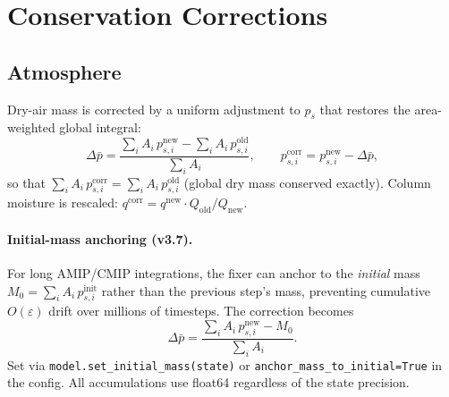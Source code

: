 \documentclass[11pt,a4paper]{article}
\begin{document}
\section{Conservation Corrections}

\subsection{Atmosphere}
Dry-air mass is corrected by a uniform adjustment to $p_s$ that restores the area-weighted global integral:
\begin{equation}
  \Delta\bar p = \frac{\sum_i A_i\,p_{s,i}^{\mathrm{new}} - \sum_i A_i\,p_{s,i}^{\mathrm{old}}}{\sum_i A_i},
  \qquad
  p_{s,i}^{\mathrm{corr}} = p_{s,i}^{\mathrm{new}} - \Delta\bar p,
\end{equation}
so that $\sum_i A_i\,p_{s,i}^{\mathrm{corr}}=\sum_i A_i\,p_{s,i}^{\mathrm{old}}$ (global dry mass conserved exactly).
Column moisture is rescaled: $q^{\mathrm{corr}}=q^{\mathrm{new}}\cdot Q_{\mathrm{old}}/Q_{\mathrm{new}}$.

\paragraph{Initial-mass anchoring (v3.7).}
For long AMIP/CMIP integrations, the fixer can anchor to the \emph{initial} mass $M_0=\sum_i A_i\,p_{s,i}^{\mathrm{init}}$ rather than the previous step's mass, preventing cumulative $O(\varepsilon)$ drift over millions of timesteps.  The correction becomes
\begin{equation}
  \Delta\bar p = \frac{\sum_i A_i\,p_{s,i}^{\mathrm{new}} - M_0}{\sum_i A_i}.
\end{equation}
Set via \texttt{model.set\_initial\_mass(state)} or \texttt{anchor\_mass\_to\_initial=True} in the config.  All accumulations use float64 regardless of the state precision.
\end{document}
